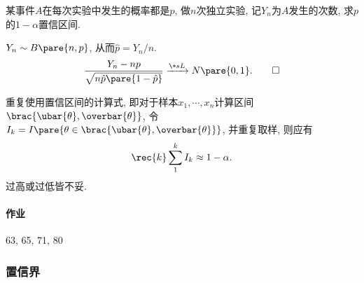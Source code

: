 \documentclass[../Statistics.tex]{subfiles}
\begin{document}
\begin{sample}
    \begin{ex}
        某事件$A$在每次实验中发生的概率都是$p$, 做$n$次独立实验, 记$Y_n$为$A$发生的次数, 求$p$的$1-\alpha$置信区间.
    \end{ex}
    \begin{solution}
        $Y_n\sim B\pare{n,p}$, 从而$\hat p = Y_n/n$. \\ 
        \[ \frac{Y_n - np}{\sqrt{n\hat{p}\pare{1-\hat{p}}}} \xrightarrow{\+sL} N\pare{0,1}. \qedhere \]
    \end{solution}
\end{sample}

\begin{remark}
    重复使用置信区间的计算式, 即对于样本$x_1,\cdots,x_n$计算区间$\brac{\ubar{\theta},\overbar{\theta}}$, 令$I_k = I\pare{\theta\in\brac{\ubar{\theta},\overbar{\theta}}}$, 并重复取样, 则应有
    \[ \rec{k} \sum_1^k I_k \approx 1-\alpha. \]
    过高或过低皆不妥.
\end{remark}

\paragraph{作业} %
\label{par:作业}

63, 65, 71, 80



\subsubsection{置信界} %
\label{ssub:置信界}
\end{document}
